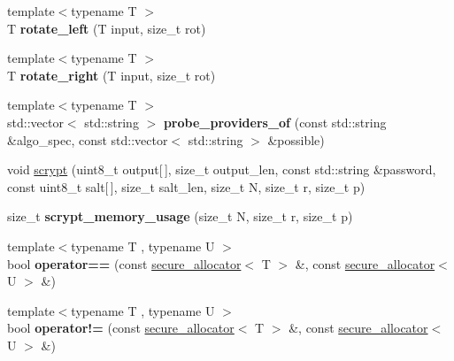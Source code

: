 \begin{DoxyCompactItemize}
\item 
\mbox{\label{namespace_botan_a6ad6271f1241d151d1fe3a1af743779c}} 
{\footnotesize template$<$typename T $>$ }\\T {\bfseries rotate\+\_\+left} (T input, size\+\_\+t rot)
\item 
\mbox{\label{namespace_botan_a61ca235c27bdd517ad57cb4aceedc293}} 
{\footnotesize template$<$typename T $>$ }\\T {\bfseries rotate\+\_\+right} (T input, size\+\_\+t rot)
\item 
\mbox{\label{namespace_botan_a2c8ae79f2e15f3ed4a57feabd42c6b9a}} 
{\footnotesize template$<$typename T $>$ }\\std\+::vector$<$ std\+::string $>$ {\bfseries probe\+\_\+providers\+\_\+of} (const std\+::string \&algo\+\_\+spec, const std\+::vector$<$ std\+::string $>$ \&possible)
\item 
void \hyperlink{namespace_botan_ae1b6ad71a73156fb774a71db9e99eb5a}{scrypt} (uint8\+\_\+t output\mbox{[}$\,$\mbox{]}, size\+\_\+t output\+\_\+len, const std\+::string \&password, const uint8\+\_\+t salt\mbox{[}$\,$\mbox{]}, size\+\_\+t salt\+\_\+len, size\+\_\+t N, size\+\_\+t r, size\+\_\+t p)
\item 
\mbox{\label{namespace_botan_a5c00a4b36c5eb825bbb255f4c3a1ad8f}} 
size\+\_\+t {\bfseries scrypt\+\_\+memory\+\_\+usage} (size\+\_\+t N, size\+\_\+t r, size\+\_\+t p)
\item 
\mbox{\label{namespace_botan_af642902e51060ac64f0278fcfaae25bc}} 
{\footnotesize template$<$typename T , typename U $>$ }\\bool {\bfseries operator==} (const \hyperlink{class_botan_1_1secure__allocator}{secure\+\_\+allocator}$<$ T $>$ \&, const \hyperlink{class_botan_1_1secure__allocator}{secure\+\_\+allocator}$<$ U $>$ \&)
\item 
\mbox{\label{namespace_botan_a0f4317d3fed122a6763016f7d0194925}} 
{\footnotesize template$<$typename T , typename U $>$ }\\bool {\bfseries operator!=} (const \hyperlink{class_botan_1_1secure__allocator}{secure\+\_\+allocator}$<$ T $>$ \&, const \hyperlink{class_botan_1_1secure__allocator}{secure\+\_\+allocator}$<$ U $>$ \&)

\end{DoxyCompactItemize}
